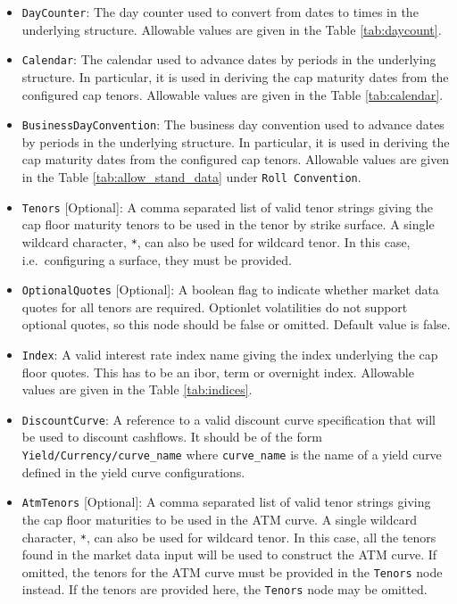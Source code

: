 \begin{itemize}
\item \lstinline!DayCounter!:
The day counter used to convert from dates to times in the underlying structure. Allowable values are given in the Table \ref{tab:daycount}.

\item \lstinline!Calendar!:
The calendar used to advance dates by periods in the underlying structure. In particular, it is used in deriving the cap maturity dates from the configured cap tenors. Allowable values are given in the Table \ref{tab:calendar}.

\item \lstinline!BusinessDayConvention!:
The business day convention used to advance dates by periods in the underlying structure. In particular, it is used in deriving the cap maturity dates from the configured cap tenors. Allowable values are given in the Table \ref{tab:allow_stand_data} under \lstinline!Roll Convention!.

\item \lstinline!Tenors! [Optional]:
A comma separated list of valid tenor strings giving the cap floor maturity tenors to be used in the tenor by strike surface. A single wildcard character, \lstinline!*!, can also be used for wildcard tenor. In this case, i.e.\ configuring a surface, they must be provided.

\item \lstinline!OptionalQuotes! [Optional]:
A boolean flag to indicate whether market data quotes for all tenors are required. Optionlet volatilities do not support optional quotes, so this node should be false or omitted. Default value is false.

\item \lstinline!Index!:
A valid interest rate index name giving the index underlying the cap floor quotes. This has to be an ibor, term or overnight index. Allowable values are given in the Table \ref{tab:indices}.

\item \lstinline!DiscountCurve!:
A reference to a valid discount curve specification that will be used to discount cashflows. It should be of the form \lstinline!Yield/Currency/curve_name! where \lstinline!curve_name! is the name of a yield curve defined in the yield curve configurations.

\item \lstinline!AtmTenors! [Optional]:
A comma separated list of valid tenor strings giving the cap floor maturities to be used in the ATM curve. A single wildcard character, \lstinline!*!, can also be used for wildcard tenor. In this case, all the tenors found in the market data input will be used to construct the ATM curve. If omitted, the tenors for the ATM curve must be provided in the \lstinline!Tenors! node instead. If the tenors are provided here, the \lstinline!Tenors! node may be omitted.


\end{itemize}
